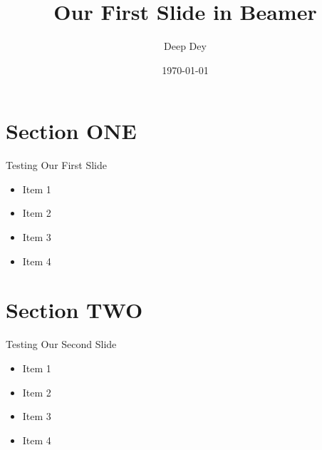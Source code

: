 \documentclass[12pt]{beamer}
\title{Our First Slide in Beamer}
\author{Deep Dey}
\institute{University of Kalyani}
\date{\today}
\begin{document}
\frame{\titlepage}
\AtBeginSection[]
{
\begin{frame}
\tableofcontents[currentsection]
\end{frame}
}
\section{Section ONE}
\begin{frame}[t]{Testing Our First Slide}
\begin{itemize}
\item Item 1
\item Item 2
\item Item 3
\item Item 4
\end{itemize}
\end{frame}

\section{Section TWO}
\begin{frame}[t]{Testing Our Second Slide}
\begin{itemize}
\item Item 1
\item Item 2
\item Item 3
\item Item 4
\end{itemize}
\end{frame}
\end{document}
